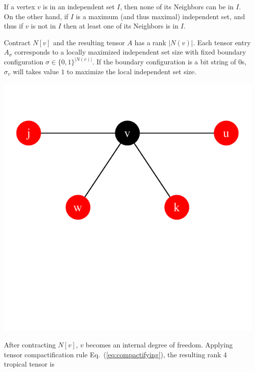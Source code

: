 \documentclass[review,onefignum,onetabnum]{siamart190516}
\newcommand{\<}{\langle}
\renewcommand{\>}{\rangle}
\newcommand{\Eq}[1]{Eq.~(\ref{#1})}
\begin{document}
\begin{corollary}\label{rule:one} %
  If a vertex $v$ is in an independent set $I$, then none of its Neighbors can be in $I$.
On the other hand, if $I$ is a maximum (and thus maximal) independent set,
and thus if $v$ is not in $I$ then at least one of its Neighbors is in $I$.
\end{corollary}

Contract $N[v]$ and the resulting tensor $A$ has a rank $|N(v)|$. Each tensor entry $A_{\sigma}$ corresponds to a locally maximized independent set size with fixed boundary configuration $\sigma \in \{0, 1\}^{|N(v)|}$.
If the boundary configuration is a bit string of 0s, $\sigma_v$ will takes value $1$ to maximize the local independent set size.

\centerline{\includegraphics[width=0.4\columnwidth,trim={0 3.5cm 0 1cm},clip]{../notebooks/basic.pdf}}

After contracting $N[v]$, $v$ becomes an internal degree of freedom.
Applying tensor compactification rule \Eq{eq:compactifying}, the resulting rank 4 tropical tensor is
\end{document}
